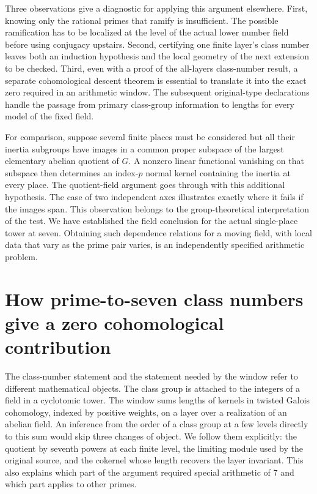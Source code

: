 \documentclass[12pt,letterpaper]{article}
\begin{document}
Three observations give a diagnostic for applying this argument elsewhere. First, knowing only the rational primes that ramify is insufficient. The possible ramification has to be localized at the level of the actual lower number field before using conjugacy upstairs. Second, certifying one finite layer's class number leaves both an induction hypothesis and the local geometry of the next extension to be checked. Third, even with a proof of the all-layers class-number result, a separate cohomological descent theorem is essential to translate it into the exact zero required in an arithmetic window. The subsequent original-type declarations handle the passage from primary class-group information to lengths for every model of the fixed field.

For comparison, suppose several finite places must be considered but all their inertia subgroups have images in a common proper subspace of the largest elementary abelian quotient of \(G\). A nonzero linear functional vanishing on that subspace then determines an index-\(p\) normal kernel containing the inertia at every place. The quotient-field argument goes through with this additional hypothesis. The case of two independent axes illustrates exactly where it fails if the images span. This observation belongs to the group-theoretical interpretation of the test. We have established the field conclusion for the actual single-place tower at seven. Obtaining such dependence relations for a moving field, with local data that vary as the prime pair varies, is an independently specified arithmetic problem.


\section{How prime-to-seven class numbers give a zero cohomological contribution}
\label{sec:seven-descent}

The class-number statement and the statement needed by the window refer to different mathematical objects. The class group is attached to the integers of a field in a cyclotomic tower. The window sums lengths of kernels in twisted Galois cohomology, indexed by positive weights, on a layer over a realization of an abelian field. An inference from the order of a class group at a few levels directly to this sum would skip three changes of object. We follow them explicitly: the quotient by seventh powers at each finite level, the limiting module used by the original source, and the cokernel whose length recovers the layer invariant. This also explains which part of the argument required special arithmetic of 7 and which part applies to other primes.
\end{document}
